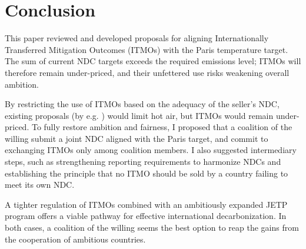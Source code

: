 ﻿\documentclass[12pt,english]{article}
\begin{document}
\section{Conclusion\label{sec:conclusion}}

This paper reviewed and developed proposals for aligning Internationally Transferred Mitigation Outcomes (ITMOs) with the Paris temperature target. The sum of current NDC targets exceeds the required emissions level; ITMOs will therefore remain under-priced, and their unfettered use risks weakening overall ambition.

By restricting the use of ITMOs based on the adequacy of the seller's NDC, existing proposals (by e.g. \citealp{michaelowa_additionality_2019}) would limit hot air, but ITMOs would remain under-priced. To fully restore ambition and fairness, I proposed that a coalition of the willing submit a joint NDC aligned with the Paris target, and commit to exchanging ITMOs only among coalition members. I also suggested intermediary steps, such as strengthening reporting requirements to harmonize NDCs and establishing the principle that no ITMO should be sold by a country failing to meet its own NDC.

A tighter regulation of ITMOs combined with an ambitiously expanded JETP program \citep{steckel_climate_2017,bolton_why_2025} offers a viable pathway for effective international decarbonization. In both cases, a coalition of the willing seems the best option to reap the gains from the cooperation of ambitious countries. 


\clearpage
\small
\renewcommand{\url}[1]{\href{#1}{Link}} %


\appendix

\renewcommand{\thetable}{A\arabic{table}}
\renewcommand{\thefigure}{A\arabic{figure}}
\setcounter{figure}{0}
\setcounter{table}{0}
\end{document}
